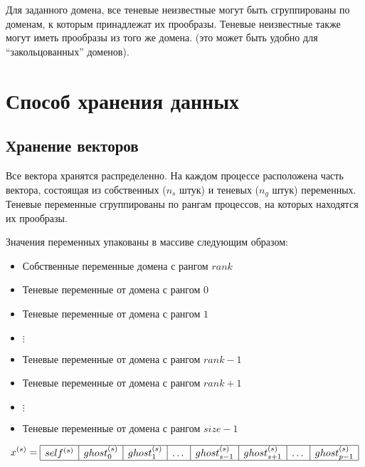 \documentclass[12pt]{article}
\begin{document}
Для заданного домена, все теневые неизвестные могут быть сгруппированы по
доменам, к которым принадлежат их прообразы. 
Теневые неизвестные также могут иметь прообразы из того же домена.
(это может быть удобно для ``закольцованных'' доменов).

\section{Способ хранения данных}
\subsection{Хранение векторов}
Все вектора хранятся распределенно. На каждом процессе расположена часть
вектора, состоящая из собственных ($n_s$ штук) и теневых
($n_g$ штук) переменных. Теневые переменные сгруппированы по рангам процессов,
на которых находятся их прообразы. 

Значения переменных упакованы в массиве следующим образом:
\begin{itemize}
\item Собственные переменные домена с рангом $rank$
\item Теневые переменные от домена с рангом $0$ 
\item Теневые переменные от домена с рангом $1$
\item $\vdots$
\item Теневые переменные от домена с рангом $rank-1$ 
\item Теневые переменные от домена с рангом $rank+1$
\item $\vdots$
\item Теневые переменные от домена с рангом $size-1$ 
\end{itemize}

$$
x^{(s)} = 
\begin{array}{|c|c|c|c|c|c|c|c|}
\hline
self^{(s)} & 
ghost^{(s)}_{0} &
ghost^{(s)}_{1} & \dots &
ghost^{(s)}_{s-1} &
ghost^{(s)}_{s+1} & \dots &
ghost^{(s)}_{p-1}\\
\hline
\end{array}
$$
\end{document}
